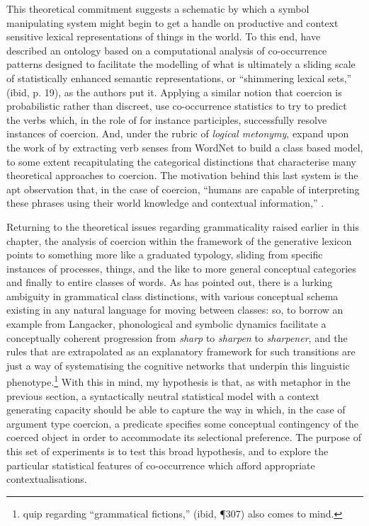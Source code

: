 This theoretical commitment suggests a schematic by which a symbol manipulating system might begin to get a handle on productive and context sensitive lexical representations of things in the world.  To this end, \cite{JezekEA2010} have described an ontology based on a computational analysis of co-occurrence patterns designed to facilitate the modelling of what is ultimately a sliding scale of statistically enhanced semantic representations, or ``shimmering lexical sets,'' (ibid, p. 19), as the authors put it.  Applying a similar notion that coercion is probabilistic rather than discreet, \cite{LapataEA2003} use co-occurrence statistics to try to predict the verbs which, in the role of for instance participles, successfully resolve instances of coercion.  And, under the rubric of \emph{logical metonymy}, \cite{ShutovaEA2013b} expand upon the work of \citeauthor{LapataEA2003} by extracting verb senses from WordNet to build a class based model, to some extent recapitulating the categorical distinctions that characterise many theoretical approaches to coercion.  The motivation behind this last system is the apt observation that, in the case of coercion, ``humans are capable of interpreting these phrases using their world knowledge and contextual information,'' \citep[][11:2]{ShutovaEA2013b}.

Returning to the theoretical issues regarding grammaticality raised earlier in this chapter, the analysis of coercion within the framework of the generative lexicon points to something more like a graduated typology, sliding from specific instances of processes, things, and the like to more general conceptual categories and finally to entire classes of words.  As \cite{Langacker1991} has pointed out, there is a lurking ambiguity in grammatical class distinctions, with various conceptual schema existing in any natural language for moving between classes: so, to borrow an example from Langacker, phonological and symbolic dynamics facilitate a conceptually coherent progression from \emph{sharp} to \emph{sharpen} to \emph{sharpener}, and the rules that are extrapolated as an explanatory framework for such transitions are just a way of systematising the cognitive networks that underpin this linguistic phenotype.\footnote{ quip regarding ``grammatical fictions,'' (ibid, \P 307) also comes to mind.}  With this in mind, my hypothesis is that, as with metaphor in the previous section, a syntactically neutral statistical model with a context generating capacity should be able to capture the way in which, in the case of argument type coercion, a predicate specifies some conceptual contingency of the coerced object in order to accommodate its selectional preference.  The purpose of this set of experiments is to test this broad hypothesis, and to explore the particular statistical features of co-occurrence which afford appropriate contextualisations.

